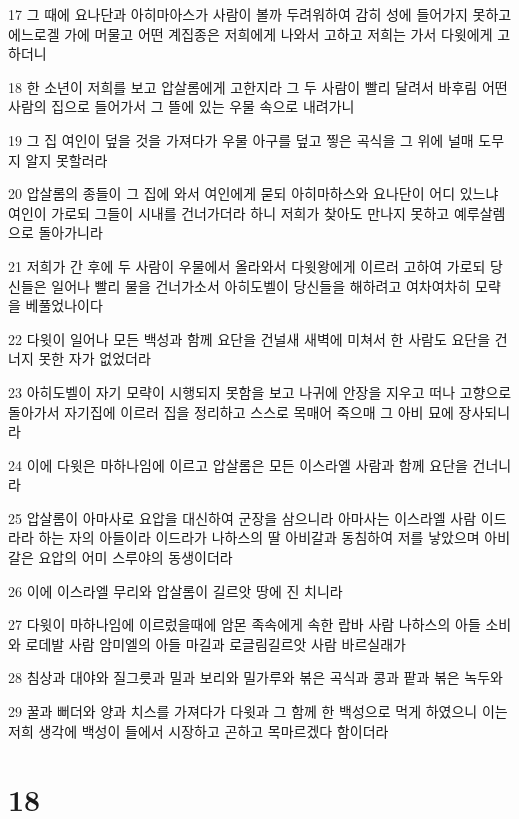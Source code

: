 \par 17 그 때에 요나단과 아히마아스가 사람이 볼까 두려워하여 감히 성에 들어가지 못하고 에느로겔 가에 머물고 어떤 계집종은 저희에게 나와서 고하고 저희는 가서 다윗에게 고하더니
\par 18 한 소년이 저희를 보고 압살롬에게 고한지라 그 두 사람이 빨리 달려서 바후림 어떤 사람의 집으로 들어가서 그 뜰에 있는 우물 속으로 내려가니
\par 19 그 집 여인이 덮을 것을 가져다가 우물 아구를 덮고 찧은 곡식을 그 위에 널매 도무지 알지 못할러라
\par 20 압살롬의 종들이 그 집에 와서 여인에게 묻되 아히마하스와 요나단이 어디 있느냐 여인이 가로되 그들이 시내를 건너가더라 하니 저희가 찾아도 만나지 못하고 예루살렘으로 돌아가니라
\par 21 저희가 간 후에 두 사람이 우물에서 올라와서 다윗왕에게 이르러 고하여 가로되 당신들은 일어나 빨리 물을 건너가소서 아히도벨이 당신들을 해하려고 여차여차히 모략을 베풀었나이다
\par 22 다윗이 일어나 모든 백성과 함께 요단을 건널새 새벽에 미쳐서 한 사람도 요단을 건너지 못한 자가 없었더라
\par 23 아히도벨이 자기 모략이 시행되지 못함을 보고 나귀에 안장을 지우고 떠나 고향으로 돌아가서 자기집에 이르러 집을 정리하고 스스로 목매어 죽으매 그 아비 묘에 장사되니라
\par 24 이에 다윗은 마하나임에 이르고 압살롬은 모든 이스라엘 사람과 함께 요단을 건너니라
\par 25 압살롬이 아마사로 요압을 대신하여 군장을 삼으니라 아마사는 이스라엘 사람 이드라라 하는 자의 아들이라 이드라가 나하스의 딸 아비갈과 동침하여 저를 낳았으며 아비갈은 요압의 어미 스루야의 동생이더라
\par 26 이에 이스라엘 무리와 압살롬이 길르앗 땅에 진 치니라
\par 27 다윗이 마하나임에 이르렀을때에 암몬 족속에게 속한 랍바 사람 나하스의 아들 소비와 로데발 사람 암미엘의 아들 마길과 로글림길르앗 사람 바르실래가
\par 28 침상과 대야와 질그릇과 밀과 보리와 밀가루와 볶은 곡식과 콩과 팥과 볶은 녹두와
\par 29 꿀과 뻐더와 양과 치스를 가져다가 다윗과 그 함께 한 백성으로 먹게 하였으니 이는 저희 생각에 백성이 들에서 시장하고 곤하고 목마르겠다 함이더라

\chapter{18}

